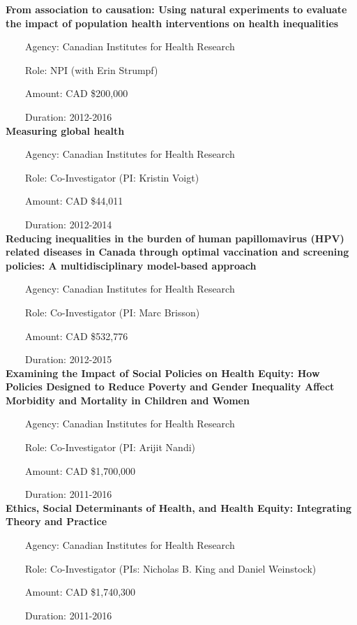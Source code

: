 \documentclass[
  letterpaper,
  DIV=11,
  numbers=noendperiod]{scrartcl}
\begin{document}
\textbf{From association to causation: Using natural experiments to
evaluate the impact of population health interventions on health
inequalities}\\
\strut ~~~~Agency: Canadian Institutes for Health Research\\
\strut ~~~~Role: NPI (with Erin Strumpf)\\
\strut ~~~~Amount: CAD \$200,000\\
\strut ~~~~Duration: 2012-2016\\

\textbf{Measuring global health}\\
\strut ~~~~Agency: Canadian Institutes for Health Research\\
\strut ~~~~Role: Co-Investigator (PI: Kristin Voigt)\\
\strut ~~~~Amount: CAD \$44,011\\
\strut ~~~~Duration: 2012-2014\\

\textbf{Reducing inequalities in the burden of human papillomavirus
(HPV) related diseases in Canada through optimal vaccination and
screening policies: A multidisciplinary model-based approach}\\
\strut ~~~~Agency: Canadian Institutes for Health Research\\
\strut ~~~~Role: Co-Investigator (PI: Marc Brisson)\\
\strut ~~~~Amount: CAD \$532,776\\
\strut ~~~~Duration: 2012-2015\\

\textbf{Examining the Impact of Social Policies on Health Equity: How
Policies Designed to Reduce Poverty and Gender Inequality Affect
Morbidity and Mortality in Children and Women}\\
\strut ~~~~Agency: Canadian Institutes for Health Research\\
\strut ~~~~Role: Co-Investigator (PI: Arijit Nandi)\\
\strut ~~~~Amount: CAD \$1,700,000\\
\strut ~~~~Duration: 2011-2016\\

\textbf{Ethics, Social Determinants of Health, and Health Equity:
Integrating Theory and Practice}\\
\strut ~~~~Agency: Canadian Institutes for Health Research\\
\strut ~~~~Role: Co-Investigator (PIs: Nicholas B. King and Daniel
Weinstock)\\
\strut ~~~~Amount: CAD \$1,740,300\\
\strut ~~~~Duration: 2011-2016\\
\end{document}
